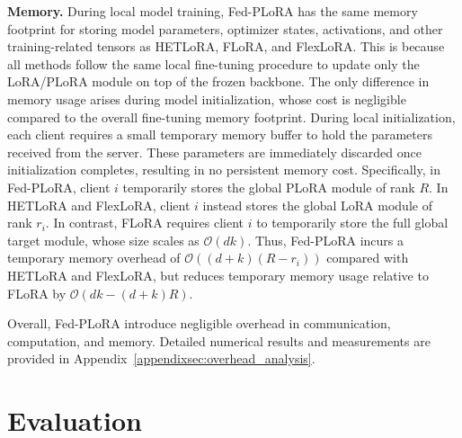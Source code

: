 \documentclass{article} %
\begin{document}
{%

\textbf{Memory.} During local model training, Fed-PLoRA has the same memory footprint for storing model parameters, optimizer states, activations, and other training-related tensors as HETLoRA, FLoRA, and FlexLoRA. This is because all methods follow the same local fine-tuning procedure to update only the LoRA/PLoRA module on top of the frozen backbone. 
The only difference in memory usage arises during model initialization, whose cost is negligible compared to the overall fine-tuning memory footprint. During local initialization, each client requires a small temporary memory buffer to hold the parameters received from the server. These parameters are immediately discarded once initialization completes, resulting in no persistent memory cost. 
Specifically, in Fed-PLoRA, client $i$ temporarily stores the global PLoRA module of rank $R$. In HETLoRA and FlexLoRA, client $i$ instead stores the global LoRA module of rank $r_i$.  In contrast, FLoRA requires client $i$ to temporarily store the full global target module, whose size scales as $\mathcal{O}(dk)$. Thus, Fed-PLoRA incurs a temporary memory overhead of $\mathcal{O}((d+k)(R-r_i))$ compared with HETLoRA and FlexLoRA, but reduces temporary memory usage relative to FLoRA by $\mathcal{O}(dk - (d+k) R)$. 


Overall, Fed-PLoRA introduce negligible overhead in communication, computation, and memory. 
Detailed numerical results and measurements are provided in Appendix~\ref{appendixsec:overhead_analysis}.
}



\section{Evaluation}\label{evaluation}
\end{document}
